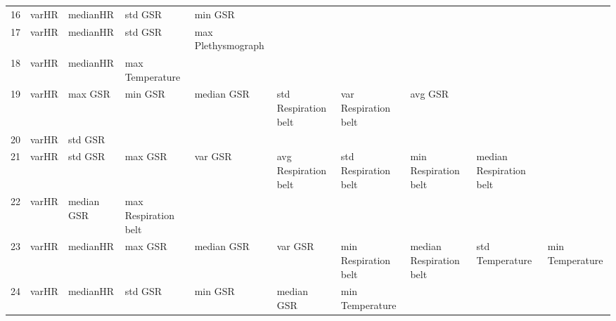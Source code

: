 \begin{landscape}
\begin{table}[]
\begin{tabular}{l|llllllll}
16       & varHR                   & medianHR                & std GSR                 & min GSR                 &                         &                       &                         &                         &                         &         \\
17       & varHR                   & medianHR                & std GSR                 & max Plethysmograph      &                         &                       &                         &                         &                         &         \\
18       & varHR                   & medianHR                & max Temperature         &                         &                         &                       &                         &                         &                         &         \\
19       & varHR                   & max GSR                 & min GSR                 & median GSR              & std Respiration belt    & var Respiration belt  & avg GSR                 &                         &                         &         \\
20       & varHR                   & std GSR                 &                         &                         &                         &                       &                         &                         &                         &         \\
21       & varHR                   & std GSR                 & max GSR                 & var GSR                 & avg Respiration belt    & std Respiration belt  & min Respiration belt    & median Respiration belt &                         &         \\
22       & varHR                   & median GSR              & max Respiration belt    &                         &                         &                       &                         &                         &                         &         \\
23       & varHR                   & medianHR                & max GSR                 & median GSR              & var GSR                 & min Respiration belt  & median Respiration belt & std Temperature         & min Temperature         &         \\
24       & varHR                   & medianHR                & std GSR                 & min GSR                 & median GSR              & min Temperature       &                         &                         &                         &         \\

\end{tabular}
\end{table}
\end{landscape}
